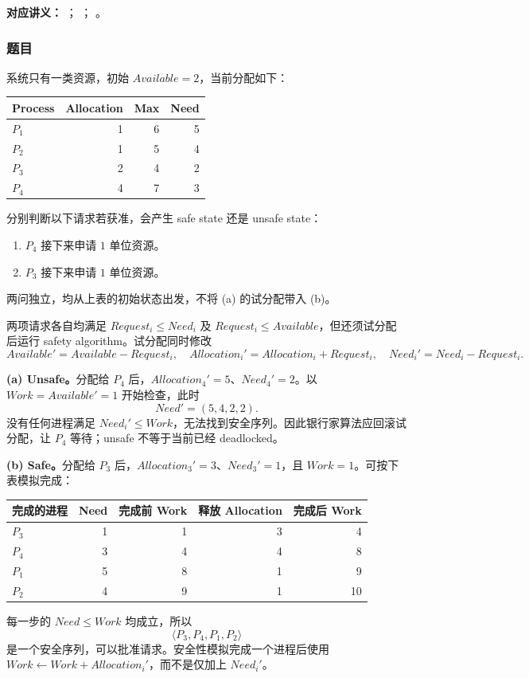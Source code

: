 
\textbf{对应讲义：}
；
；
。

\subsubsection*{题目}

系统只有一类资源，初始 $Available=2$，当前分配如下：
\begin{center}
\begin{tabular}{@{}lrrr@{}}
  \toprule
  Process & Allocation & Max & Need \\
  \midrule
  $P_1$ & 1 & 6 & 5 \\
  $P_2$ & 1 & 5 & 4 \\
  $P_3$ & 2 & 4 & 2 \\
  $P_4$ & 4 & 7 & 3 \\
  \bottomrule
\end{tabular}
\end{center}
分别判断以下请求若获准，会产生 safe state 还是 unsafe state：
\begin{enumerate}[label=(\alph*)]
  \item $P_4$ 接下来申请 $1$ 单位资源。
  \item $P_3$ 接下来申请 $1$ 单位资源。
\end{enumerate}
两问独立，均从上表的初始状态出发，不将 (a) 的试分配带入 (b)。

\begin{checkedsolution}
\nopagebreak[4]
两项请求各自均满足 $Request_i\le Need_i$ 及 $Request_i\le Available$，但还须试分配后运行 safety algorithm。试分配同时修改
\[
  Available'=Available-Request_i,\quad
  Allocation_i'=Allocation_i+Request_i,\quad
  Need_i'=Need_i-Request_i.
\]

\textbf{(a) Unsafe。}分配给 $P_4$ 后，$Allocation_4'=5$、$Need_4'=2$。以 $Work=Available'=1$ 开始检查，此时
\[
  Need'=(5,4,2,2).
\]
没有任何进程满足 $Need_i'\le Work$，无法找到安全序列。因此银行家算法应回滚试分配，让 $P_4$ 等待；unsafe 不等于当前已经 deadlocked。

\textbf{(b) Safe。}分配给 $P_3$ 后，$Allocation_3'=3$、$Need_3'=1$，且 $Work=1$。可按下表模拟完成：
\begin{center}
\begin{tabular}{@{}lrrrr@{}}
  \toprule
  完成的进程 & Need & 完成前 Work & 释放 Allocation & 完成后 Work \\
  \midrule
  $P_3$ & 1 & 1 & 3 & 4 \\
  $P_4$ & 3 & 4 & 4 & 8 \\
  $P_1$ & 5 & 8 & 1 & 9 \\
  $P_2$ & 4 & 9 & 1 & 10 \\
  \bottomrule
\end{tabular}
\end{center}
每一步的 $Need\le Work$ 均成立，所以
\[
  \boxed{\langle P_3,P_4,P_1,P_2\rangle}
\]
是一个安全序列，可以批准请求。安全性模拟完成一个进程后使用 $Work\leftarrow Work+Allocation_i'$，而不是仅加上 $Need_i'$。
\end{checkedsolution}

